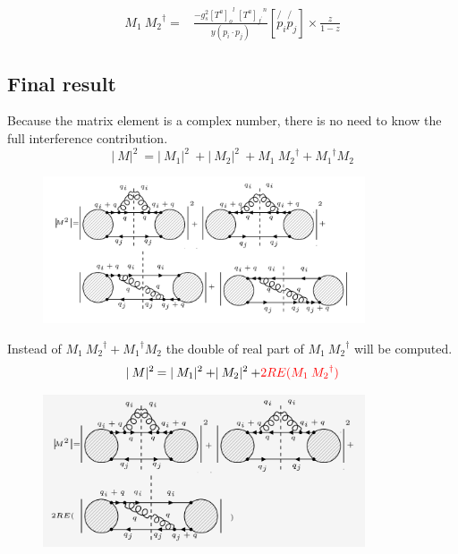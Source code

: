 \begin{equation}
\begin{split}
M_1\: {M_2}^{\dagger} =& \frac{-g_s^2 {[T^a]_o}^l \:{[T^a]_{f^{\prime}}}^n }{y(p_i \cdot p_j)} [\not{p_i}\not{p_j}]\times\frac{z}{1-z}
\end{split}
\end{equation}





\subsection{Final result}
\label{fin}
Because the matrix element is a complex number, there is no need to know the full interference contribution.
\begin{equation}
\lvert\:M\lvert^2\: = \lvert\:M_1\lvert^2\:+\lvert\:M_2\lvert^2\:+ M_1\: {M_2}^{\dagger} +{M_1}^{\dagger} M_2
\end{equation}
\begin{figure}[h!]
\centering
\includegraphics[width=0.85\textwidth]{images/QQ/qqgMSquer.png}
\end{figure}
Instead of $ M_1\: {M_2}^{\dagger} +{M_1}^{\dagger} M_2 $ the double of real part of $M_1\: {M_2}^{\dagger}$ will be computed.
\begin{equation}
\lvert\:M\lvert^2\: = \lvert\:M_1\lvert^2\:+\lvert\:M_2\lvert^2\:+ {\color[RGB]{255,0,0} 2RE(M_1\: {M_2}^{\dagger})}
\end{equation}
\begin{figure}[h!]
\centering
\includegraphics[width=0.85\textwidth]{images/QQ/REqqgMSquer.png}
\end{figure}
